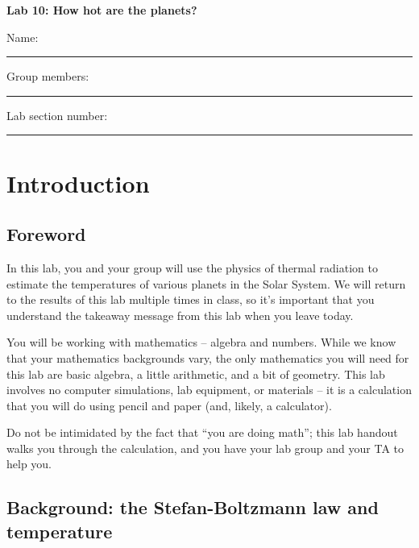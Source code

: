 \documentclass[11pt]{article}
\begin{document}
\begin{center}
\textbf{\Huge
Lab 10: How hot are the planets?\\
\vspace*{0.1cm}
}
\end{center}

\vspace*{0.5cm}

{\Large Name:}\vspace*{0.5cm}\\\hrule
{\Large Group members:}\vspace*{0.5cm}\\\hrule
{\Large Lab section number:}\vspace*{0.5cm}\\\hrule


\section{Introduction}

\subsection*{Foreword}

In this lab, you and your group
will use the physics of thermal radiation to estimate the temperatures of various planets in the Solar System. We will return
to the results of this lab multiple times in class, so it's important that you understand the takeaway message from this lab
when you leave today.

You will be working with mathematics -- algebra and numbers. While we know that your mathematics backgrounds vary, the only mathematics you will need for this lab are
basic algebra, a little arithmetic, and a bit of geometry. This lab involves no computer simulations, lab equipment, or materials -- it is a calculation that you will do using
pencil and paper (and, likely, a calculator).

Do not be intimidated by the fact that ``you are doing math''; this lab handout walks you through the calculation, and you have your lab group and your TA to help you.

\subsection*{Background: the Stefan-Boltzmann law and temperature}
\end{document}
